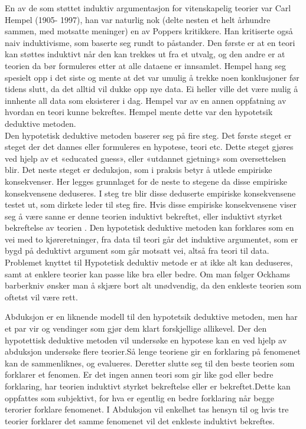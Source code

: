 \documentclass[
]{book}
\begin{document}
En av de som støttet induktiv argumentasjon for vitenskapelig teorier var Carl Hempel (1905- 1997), han var naturlig nok (delte nesten et helt århundre sammen, med motsatte meninger) en av Poppers kritikkere. Han kritiserte også naiv induktivisme, som baserte seg rundt to påstander. Den første er at en teori kan støttes induktivt når den kan trekkes ut fra et utvalg, og den andre er at teorien da bør formuleres etter at alle dataene er innsamlet. Hempel hang seg spesielt opp i det siste og mente at det var umulig å trekke noen konklusjoner før tidens slutt, da det alltid vil dukke opp nye data. Ei heller ville det være mulig å innhente all data som eksisterer i dag. \citep[s. 11]{hempel1966} Hempel var av en annen oppfatning av hvordan en teori kunne bekreftes. Hempel mente dette var den hypotetsik deduktive metoden.\\

Den hypotetisk deduktive metoden baserer seg på fire steg. Det første steget er steget der det dannes eller formuleres en hypotese, teori etc. Dette steget gjøres ved hjelp av et «educated guess», eller «utdannet gjetning» som oversettelsen blir. Det neste steget er deduksjon, som i praksis betyr å utlede empiriske konsekvenser. Her legges grunnlaget for de neste to stegene da disse empiriske konsekvensene deduseres. I steg tre blir disse deduserte empiriske konsekvensene testet ut, som dirkete leder til steg fire. Hvis disse empiriske konsekvensene viser seg å være sanne er denne teorien induktivt bekreftet, eller induktivt styrket bekreftelse av teorien \citep[s.12-13]{hempel1966}. Den hypotetisk deduktive metoden kan forklares som en vei med to kjøreretninger, fra data til teori går det induktive argumentet, som er bygd på deduktivt argument som går motsatt vei, altså fra teori til data. Problemet knyttet til Hypotetisk deduktiv metode er at ikke alt kan deduseres, samt at enklere teorier kan passe like bra eller bedre. Om man følger Ockhams barberkniv ønsker man å skjære bort alt unødvendig, da den enkleste teorien som oftetst vil være rett.

Abduksjon er en liknende modell til den hypotetsik deduktive metoden, men har et par vir og vendinger som gjør dem klart forskjellige allikevel. Der den hypotettisk deduktive metoden vil undersøke en hypotese kan en ved hjelp av abduksjon undersøke flere teorier.Så lenge teoriene gir en forklaring på fenomenet kan de sammenliknes, og evalueres. Deretter slutte seg til den beste teorien som forklarer et fenomen. Er det ingen annen teori som gir like god eller bedre forklaring, har teorien induktivt styrket bekreftelse eller er bekreftet.Dette kan oppfattes som subjektivt, for hva er egentlig en bedre forklaring når begge terorier forklare fenomenet. I Abduksjon vil enkelhet tas hensyn til og hvis tre teorier forklarer det samme fenomenet vil det enkleste induktivt bekreftes.
\end{document}
